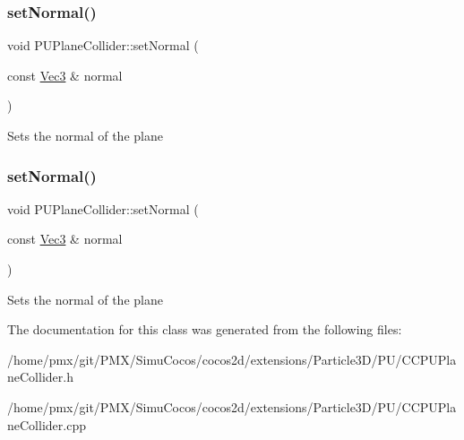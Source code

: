 \subsubsection{\texorpdfstring{set\+Normal()}{setNormal()}\hspace{0.1cm}{\footnotesize\ttfamily [1/2]}}
{\footnotesize\ttfamily void P\+U\+Plane\+Collider\+::set\+Normal (\begin{DoxyParamCaption}\item[{const \hyperlink{classVec3}{Vec3} \&}]{normal }\end{DoxyParamCaption})}

Sets the normal of the plane \mbox{\label{classPUPlaneCollider_a527e29896ed1c6a741dad6225ba650b5}} 
\subsubsection{\texorpdfstring{set\+Normal()}{setNormal()}\hspace{0.1cm}{\footnotesize\ttfamily [2/2]}}
{\footnotesize\ttfamily void P\+U\+Plane\+Collider\+::set\+Normal (\begin{DoxyParamCaption}\item[{const \hyperlink{classVec3}{Vec3} \&}]{normal }\end{DoxyParamCaption})}

Sets the normal of the plane 

The documentation for this class was generated from the following files\+:\begin{DoxyCompactItemize}
\item 
/home/pmx/git/\+P\+M\+X/\+Simu\+Cocos/cocos2d/extensions/\+Particle3\+D/\+P\+U/C\+C\+P\+U\+Plane\+Collider.\+h\item 
/home/pmx/git/\+P\+M\+X/\+Simu\+Cocos/cocos2d/extensions/\+Particle3\+D/\+P\+U/C\+C\+P\+U\+Plane\+Collider.\+cpp\end{DoxyCompactItemize}
